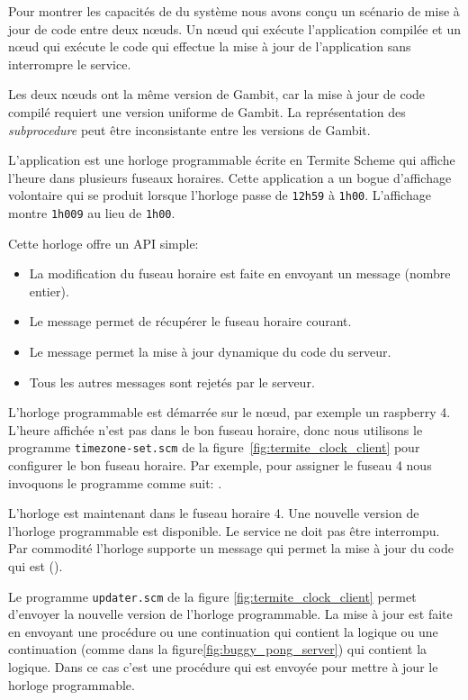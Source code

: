Pour montrer les capacités de du système nous avons conçu un scénario de mise à
jour de code entre deux nœuds. Un nœud qui exécute l'application compilée et un
nœud qui exécute le code qui effectue la mise à jour de l'application sans
interrompre le service.

Les deux nœuds ont la même version de Gambit, car la mise à jour de code
compilé requiert une version uniforme de Gambit. La représentation des
\textit{subprocedure} peut être inconsistante entre les versions de Gambit.

L'application est une horloge programmable écrite en Termite Scheme qui affiche
l'heure dans plusieurs fuseaux horaires. Cette application a un bogue
d'affichage volontaire qui se produit lorsque l'horloge passe de {\tt 12h59} à
{\tt 1h00}. L'affichage montre {\tt 1h009} au lieu de {\tt 1h00}.

Cette horloge offre un API simple:
\begin{itemize}
  \item La modification du fuseau horaire est faite en envoyant
    un message (nombre entier).

  \item Le message  permet de récupérer
    le fuseau horaire courant.

  \item Le message  permet la mise à jour
    dynamique du code du serveur.

  \item Tous les autres messages sont rejetés par le serveur.
\end{itemize}

L'horloge programmable est démarrée sur le nœud, par exemple un raspberry 4.
L'heure affichée n'est pas dans le bon fuseau horaire, donc nous utilisons
le programme \texttt{timezone-set.scm} de la figure~\ref{fig:termite_clock_client}
pour configurer le bon fuseau horaire. Par exemple, pour assigner le fuseau 4
nous invoquons le programme comme suit: .

L'horloge est maintenant dans le fuseau horaire 4. Une nouvelle version de
l'horloge programmable est disponible. Le service ne doit pas être interrompu.
Par commodité l'horloge supporte un message qui permet la mise à jour
du code qui est ().

Le programme \texttt{updater.scm} de la figure \ref{fig:termite_clock_client}
permet d'envoyer la nouvelle version de l'horloge programmable. La mise à jour
est faite en envoyant une procédure ou une continuation qui contient la logique
ou une continuation (comme dans la figure\ref{fig:buggy_pong_server}) qui
contient la logique. Dans ce cas c'est une procédure qui est envoyée
pour mettre à jour le horloge programmable.

